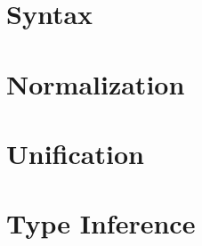 \documentclass[acmsmall,review,anonymous]{acmart}
\begin{document}
\section{Syntax}
\label{sec:syntax}


\section{Normalization}
\label{sec:normalization}


\section{Unification}
\label{sec:unification}


\section{Type Inference}
\label{sec:typeinference}





\appendix
\end{document}
